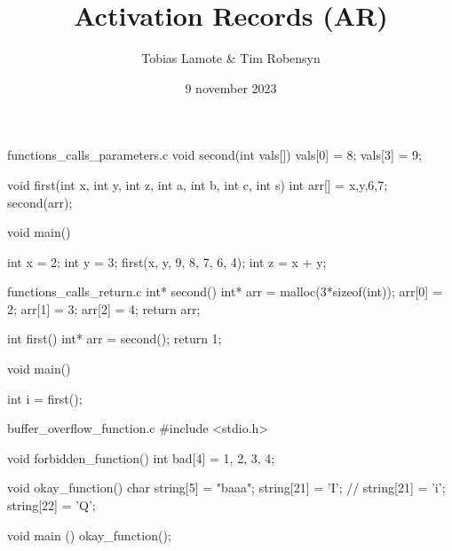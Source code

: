\documentclass{beamer}
\title{Activation Records (AR)}
\author{Tobias Lamote \& Tim Robensyn}
\date{9 november 2023}
\begin{document}

\begin{VerbatimOut}{functions_calls_parameters.c}
void second(int vals[]) {
    vals[0] = 8;
    vals[3] = 9;
}

void first(int x, int y, int z, int a, int b, int c, int s) {
    int arr[] = {x,y,6,7};
    second(arr);
}

void main() {


    int x = 2;
    int y = 3;
    first(x, y, 9, 8, 7, 6, 4);
    int z = x + y;

}
\end{VerbatimOut}
\begin{VerbatimOut}{functions_calls_return.c}
int* second() {
    int* arr = malloc(3*sizeof(int));
    arr[0] = 2;
    arr[1] = 3;
    arr[2] = 4;
    return arr;
}

int first() {
    int* arr = second();
    return 1;
}

void main() {

    int i = first();

}
\end{VerbatimOut}
\begin{VerbatimOut}{buffer_overflow_function.c}
#include <stdio.h>

void forbidden_function()
{
    int bad[4] = {1, 2, 3, 4};
}

void okay_function()
{
    char string[5] = "baaa";
    string[21] = 'I';
    // string[21] = 'i';
    string[22] = 'Q';
}

void main ()
{
    okay_function();
}
\end{VerbatimOut}


\frame{\titlepage}
\end{document}
